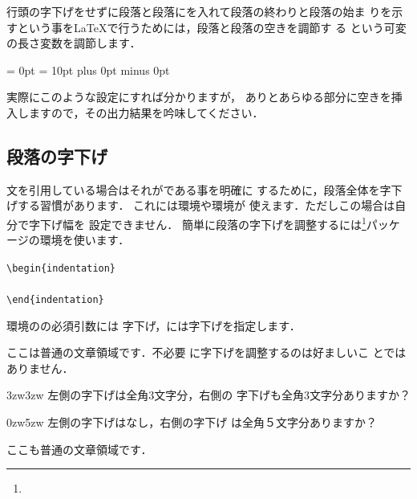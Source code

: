 %

\begin{Prob}
行頭の字下げをせずに段落と段落にを入れて段落の終わりと段落の始ま
りを示すという事を{\LaTeX}で行うためには，段落と段落の空きを調節す
る という可変の長さ変数を調節します．

\begin{InTeX}
\parindent = 0pt %
\parskip = 10pt plus 0pt minus 0pt
\end{InTeX}

実際にこのような設定にすれば分かりますが，
ありとあらゆる部分に空きを挿入しますので，その出力結果を吟味してください．
\end{Prob}


\subsection{段落の字下げ\zdash{}}

%
%
文を引用している場合はそれがである事を明確に
するために，段落全体を字下げする習慣があります．
これには環境や環境が
使えます．ただしこの場合は自分で字下げ幅を
設定できません．%
簡単に段落の字下げを調整するには\footnote{}パッケージの環境を使います．

\begin{Syntax}
 \verb|\begin{indentation}|\\
 \\
 \verb|\end{indentation}|
\end{Syntax}

環境のの必須引数には
字下げ，には字下げを指定します．
\begin{InOut}
ここは普通の文章領域です．不必要
に字下げを調整するのは好ましいこ
とではありません．
\begin{indentation}{3zw}{3zw}
左側の字下げは全角3文字分，右側の
字下げも全角3文字分ありますか？
\end{indentation}
\begin{indentation}{0zw}{5zw}
左側の字下げはなし，右側の字下げ
は全角５文字分ありますか？
\end{indentation}
ここも普通の文章領域です．
\end{InOut}


